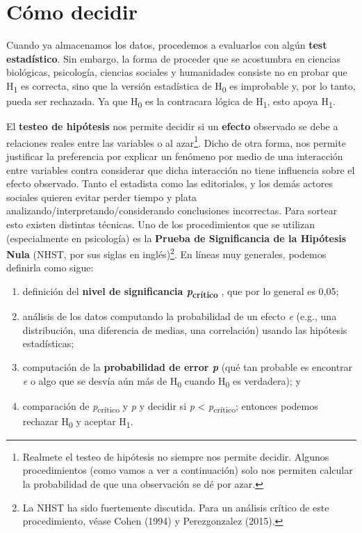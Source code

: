 \documentclass[12pt,spanish,a4paper,]{article}
\providecommand{\tightlist}{%
  \setlength{\itemsep}{0pt}\setlength{\parskip}{0pt}}
\let\rmarkdownfootnote\footnote%
\def\footnote{\protect\rmarkdownfootnote}
\begin{document}
\hypertarget{como-decidir}{%
\section{Cómo decidir}\label{como-decidir}}

Cuando ya almacenamos los datos, procedemos a evaluarlos con algún
\textbf{test estadístico}. Sin embargo, la forma de proceder que se
acostumbra en ciencias biológicas, psicología, ciencias sociales y
humanidades consiste no en probar que H\textsubscript{1} es correcta,
sino que la versión estadística de H\textsubscript{0} es improbable y,
por lo tanto, pueda ser rechazada. Ya que H\textsubscript{0} es la
contracara lógica de H\textsubscript{1}, esto apoya H\textsubscript{1}.

El \textbf{testeo de hipótesis} nos permite decidir si un
\textbf{efecto} observado se debe a relaciones reales entre las
variables o al azar\footnote{Realmete el testeo de hipótesis no siempre
  nos permite decidir. Algunos procedimientos (como vamos a ver a
  continuación) solo nos permiten calcular la probabilidad de que una
  observación se dé por azar.}. Dicho de otra forma, nos permite
justificar la preferencia por explicar un fenómeno por medio de una
interacción entre variables contra considerar que dicha interacción no
tiene influencia sobre el efecto observado. Tanto el estadista como las
editoriales, y los demás actores sociales quieren evitar perder tiempo y
plata analizando/interpretando/considerando conclusiones incorrectas.
Para sortear esto existen distintas técnicas. Uno de los procedimientos
que se utilizan (especialmente en psicología) es la \textbf{Prueba de
Significancia de la Hipótesis} \textbf{Nula} (NHST, por sus siglas en
inglés)\footnote{La NHST ha sido fuertemente discutida. Para un análisis
  crítico de este procedimiento, véase Cohen (1994) y Perezgonzalez
  (2015).}. En líneas muy generales, podemos definirla como sigue:

\begin{enumerate}
\def\labelenumi{\arabic{enumi}.}
\tightlist
\item
  definición del \textbf{nivel de significancia
  \emph{p}\textsubscript{crítico}} , que por lo general es 0,05;
\item
  análisis de los datos computando la probabilidad de un efecto \emph{e}
  (e.g., una distribución, una diferencia de medias, una correlación)
  usando las hipótesis estadísticas;
\item
  computación de la \textbf{probabilidad de error \emph{p}} (qué tan
  probable es encontrar \emph{e} o algo que se desvía aún más de
  H\textsubscript{0} cuando H\textsubscript{0} es verdadera); y
\item
  comparación de \emph{p}\textsubscript{crítico} y \emph{p} y decidir si
  \emph{p} \textless{} \emph{p}\textsubscript{crítico}; entonces podemos
  rechazar H\textsubscript{0} y aceptar H\textsubscript{1}.
\end{enumerate}
\end{document}
